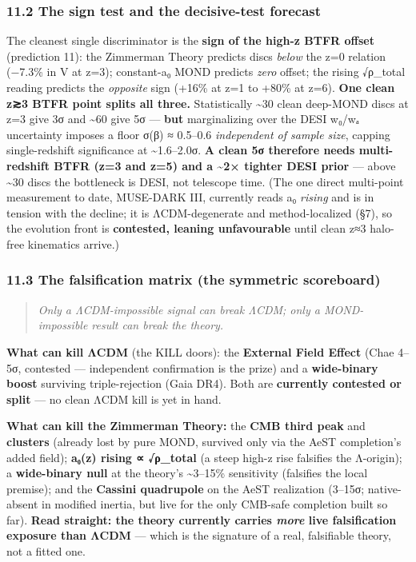 \documentclass[
]{article}
\begin{document}
\subsubsection{11.2 The sign test and the decisive-test
forecast}\label{the-sign-test-and-the-decisive-test-forecast}

The cleanest single discriminator is the \textbf{sign of the high-z BTFR
offset} (prediction 11): the Zimmerman Theory predicts discs
\emph{below} the z=0 relation (−7.3\% in V at z=3); constant-a₀ MOND
predicts \emph{zero} offset; the rising √ρ\_total reading predicts the
\emph{opposite} sign (+16\% at z=1 to +80\% at z=6). \textbf{One clean
z≳3 BTFR point splits all three.} Statistically \textasciitilde30 clean
deep-MOND discs at z=3 give 3σ and \textasciitilde60 give 5σ ---
\textbf{but} marginalizing over the DESI w₀/wₐ uncertainty imposes a
floor σ(β) ≈ 0.5--0.6 \emph{independent of sample size}, capping
single-redshift significance at \textasciitilde1.6--2.0σ. \textbf{A
clean 5σ therefore needs multi-redshift BTFR (z=3 and z=5) and a
\textasciitilde2× tighter DESI prior} --- above \textasciitilde30 discs
the bottleneck is DESI, not telescope time. (The one direct multi-point
measurement to date, MUSE-DARK III, currently reads a₀ \emph{rising} and
is in tension with the decline; it is ΛCDM-degenerate and
method-localized (§7), so the evolution front is \textbf{contested,
leaning unfavourable} until clean z≈3 halo-free kinematics arrive.)

\subsubsection{11.3 The falsification matrix (the symmetric
scoreboard)}\label{the-falsification-matrix-the-symmetric-scoreboard}

\begin{quote}
\emph{Only a ΛCDM-impossible signal can break ΛCDM; only a
MOND-impossible result can break the theory.}
\end{quote}

\textbf{What can kill ΛCDM} (the KILL doors): the \textbf{External Field
Effect} (Chae 4--5σ, contested --- independent confirmation is the
prize) and a \textbf{wide-binary boost} surviving triple-rejection (Gaia
DR4). Both are \textbf{currently contested or split} --- no clean ΛCDM
kill is yet in hand.

\textbf{What can kill the Zimmerman Theory:} the \textbf{CMB third peak}
and \textbf{clusters} (already lost by pure MOND, survived only via the
AeST completion's added field); \textbf{a₀(z) rising ∝ √ρ\_total} (a
steep high-z rise falsifies the Λ-origin); a \textbf{wide-binary null}
at the theory's \textasciitilde3--15\% sensitivity (falsifies the local
premise); and the \textbf{Cassini quadrupole} on the AeST realization
(3--15σ; native-absent in modified inertia, but live for the only
CMB-safe completion built so far). \textbf{Read straight: the theory
currently carries \emph{more} live falsification exposure than ΛCDM} ---
which is the signature of a real, falsifiable theory, not a fitted one.
\end{document}
